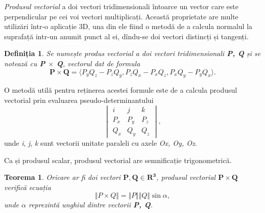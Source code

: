 \textit{Produsul vectorial} a doi vectori tridimensionali întoarce un vector
care este perpendicular pe cei voi vectori multiplicați. Această proprietate are
multe utilizări într-o aplicație 3D, una din ele fiind o metodă de a calcula
normalul la suprafață intr-un anumit punct al ei, dîndu-se doi vectori distincți
și tangenți.

\newtheorem{crossproduct_def}[def_dotproduct]{Definiția}
\begin{crossproduct_def}
Se numește produs vectorial a doi vectori tridimensionali \textbf{P, Q} și se
notează cu \textbf{P $\times$ Q}, vectorul dat de formula
\begin{equation}
\label{eq:vec:12}
\mathbf{P \times Q} = \langle P_yQ_z - P_zQ_y, P_zQ_x - P_xQ_z, P_xQ_y - P_yQ_x
\rangle.
\end{equation}
\end{crossproduct_def}
O metodă utilă pentru reținerea acestei formule este de a calcula produsul
vectorial prin evaluarea pseudo-determinantului
\begin{equation}
\begin{vmatrix}
i & j & k \\
P_x & P_y & P_z \\
Q_x & Q_y & Q_z
\end{vmatrix},
\end{equation} unde \textit{i}, \textit{j}, \textit{k} sunt vectorii unitate
paraleli cu axele \textit{Ox, Oy, Oz}.

\indent
Ca și produsul scalar, produsul vectorial are semnificație trigonometrică.

\newtheorem{crossproduct_trig}[vector_arith]{Teorema}
\begin{crossproduct_trig}
Oricare ar fi doi vectori $\mathbf{P, Q \in R^3}$, produsul vectorial
$\mathbf{P \times Q}$ verifică ecuația
\begin{equation}
\label{eq:vec:13}
\Vert P \times Q \Vert = \Vert P \Vert \Vert Q \Vert \sin \alpha,
\end{equation} unde $\alpha$ reprezintă unghiul dintre vectorii \textbf{P, Q}.
\end{crossproduct_trig}

